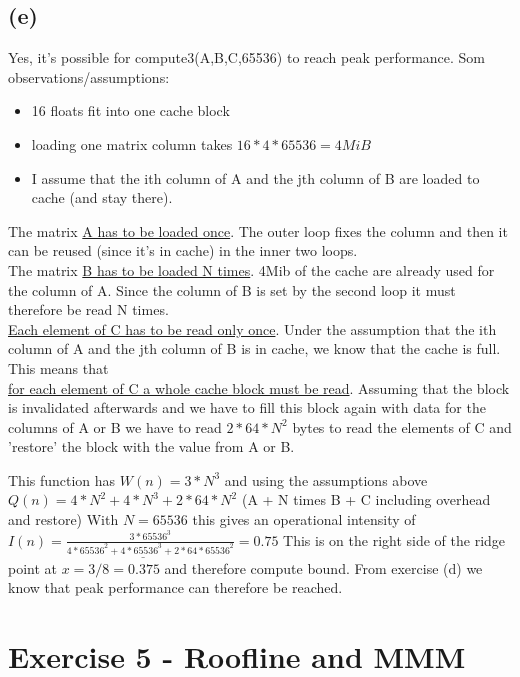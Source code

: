 \documentclass[10pt,a4paper,oneside,notitlepage]{report}
\begin{document}
\subsection*{(e)}
Yes, it's possible for compute3(A,B,C,65536) to reach peak performance. 
Som observations/assumptions:
\begin{itemize}
\item 16 floats fit into one cache block
\item loading one matrix column takes $16*4*65536=4MiB$
\item I assume that the ith column of A and the jth column of B are loaded to cache (and stay there).
\end{itemize}
The matrix \underline{A has to be loaded once}. The outer loop fixes the column and then it can be reused (since it's in cache) in the inner two loops.\\ The matrix \underline{B has to be loaded N times}. 4Mib of the cache are already used for the column of A. Since the column of B is set by the second loop it must therefore be read N times. \\
\underline{Each element of C has to be read only once}. Under the assumption that the ith column of A and the jth column of B is in cache, we know that the cache is full. This means that\\ \underline{for each element of C a whole cache block must be read}. Assuming that the block is invalidated afterwards and we have to fill this block again with data for the columns of A or B we have to read $2*64*N^2$ bytes to read the elements of C and 'restore' the block with the value from A or B.

This function has $W(n)=3*N^3$ and using the assumptions above\\ $Q(n)=4*N^2+4*N^3+2*64*N^2$ (A + N times B + C including overhead and restore) With $N=65536$ this gives an operational intensity of $\underline{I(n)=\frac{3*65536^3}{4*65536^2+4*65536^3+2*64*65536^2}=0.75}$
This is on the right side of the ridge point at $x=3/8=0.375$ and therefore compute bound. From exercise (d) we know that peak performance can therefore be reached.

\section*{Exercise 5 - Roofline and MMM}
\end{document}
